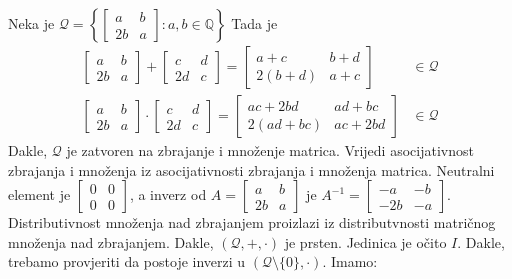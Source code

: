 \documentclass{exam}
\begin{document}
\begin{questions}
\begin{solution}
  Neka je $\mathcal{Q} = \left\{
    \begin{bmatrix}
      a & b\\
      2b & a
    \end{bmatrix}: a, b \in \mathbb{Q}
  \right\}$ Tada je
  \begin{align*}
    \begin{bmatrix}
      a & b\\
      2b & a
    \end{bmatrix} +
    \begin{bmatrix}
      c & d\\
      2d & c
    \end{bmatrix} =
    \begin{bmatrix}
      a + c & b + d\\
      2(b + d) & a + c
    \end{bmatrix} &\in \mathcal{Q}\\
    \begin{bmatrix}
      a & b\\
      2b & a
    \end{bmatrix} \cdot
    \begin{bmatrix}
      c & d\\
      2d & c
    \end{bmatrix} =
    \begin{bmatrix}
      ac + 2bd & ad + bc\\
      2(ad + bc) & ac + 2bd
    \end{bmatrix} &\in \mathcal{Q}
  \end{align*}
  Dakle, $\mathcal{Q}$ je zatvoren na zbrajanje i množenje matrica. Vrijedi asocijativnost zbrajanja i množenja iz asocijativnosti zbrajanja i množenja matrica. Neutralni element je $
  \begin{bmatrix}
    0 & 0\\
    0 & 0
  \end{bmatrix}$, a inverz od $A =
  \begin{bmatrix}
    a & b\\
    2b & a
  \end{bmatrix}$ je $A^{-1} =
  \begin{bmatrix}
    -a & -b\\
    -2b & -a
  \end{bmatrix}$. Distributivnost množenja nad zbrajanjem proizlazi iz distributvnosti matričnog množenja nad zbrajanjem. Dakle, $(\mathcal{Q}, +, \cdot)$ je prsten. Jedinica je očito $I$. Dakle, trebamo provjeriti da postoje inverzi u $(\mathcal{Q} \setminus \{0\}, \cdot)$. Imamo:

\end{solution}
\end{questions}
\end{document}
